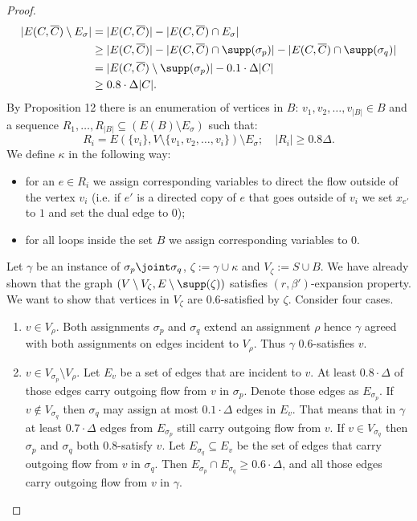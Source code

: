 \begin{proof}
\begin{align*}
|E(C,\overline C)\setminus E_\sigma|&=|E(C,\overline C)|-|E(C,\overline C)\cap E_\sigma|\\
&\ge|E(C,\overline C)|-|E(C,\overline C)\cap\supp(\sigma_p)|-|E(C,\overline C)\cap\supp(\sigma_q)|\\
&=|E(C,\overline C)\setminus\supp(\sigma_p)|-0.1\cdot\Delta|C|\\
&\ge0.8\cdot\Delta|C|.
\end{align*}
By Proposition 12 there is an enumeration of vertices in $B$: $v_1,v_2,\ldots,v_{|B|}\in B$ and a sequence $R_1,\ldots,R_{|B|}\subseteq(E(B)\setminus E_\sigma)$ such that:
\[R_i=E(\{v_i\},V\setminus\{v_1,v_2,\ldots,v_i\})\setminus E_\sigma;\quad |R_i|\ge0.8\Delta.\]
We define $\kappa$ in the following way:
\begin{itemize}\item for an $e\in R_i$ we assign corresponding variables to direct the flow outside of the vertex $v_i$ (i.e. if $e'$ is a directed copy of $e$ that goes outside of $v_i$ we set $x_{e'}$ to $1$ and set the dual edge to $0$);
\item for all loops inside the set $B$ we assign corresponding variables to $0$.\end{itemize}
Let $\gamma$ be an instance of $\sigma_p\joint\sigma_q$, $\zeta:=\gamma\cup\kappa$ and $V_\zeta:=S\cup B$. We have already shown that the graph $(V\setminus V_\zeta,E\setminus\supp(\zeta))$ satisfies $(r,\beta')$-expansion property. We want to show that vertices in $V_\zeta$ are $0.6$-satisfied by $\zeta$. Consider four cases.
\begin{enumerate}
\item $v\in V_\rho$. Both assignments $\sigma_p$ and $\sigma_q$ extend an assignment $\rho$ hence $\gamma$ agreed with both assignments on edges incident to $V_\rho$. Thus $\gamma$ $0.6$-satisfies $v$.
\item $v\in V_{\sigma_p}\setminus V_\rho$. Let $E_v$ be a set of edges that are incident to $v$. At least $0.8\cdot\Delta$ of those edges carry outgoing flow from $v$ in $\sigma_p$. Denote those edges as $E_{\sigma_p}$.
If $v\notin V_{\sigma_q}$ then $\sigma_q$ may assign at most $0.1\cdot\Delta$ edges in $E_v$. That means that in $\gamma$ at least $0.7\cdot\Delta$ edges from $E_{\sigma_p}$ still carry outgoing flow from $v$.
If $v\in V_{\sigma_q}$ then $\sigma_p$ and $\sigma_q$ both $0.8$-satisfy $v$. Let $E_{\sigma_q}\subseteq E_v$ be the set of edges that carry outgoing flow from $v$ in $\sigma_q$. Then $E_{\sigma_p}\cap E_{\sigma_q}\ge0.6\cdot\Delta$, and all those edges carry outgoing flow from $v$ in $\gamma$.

\end{enumerate}
\end{proof}
